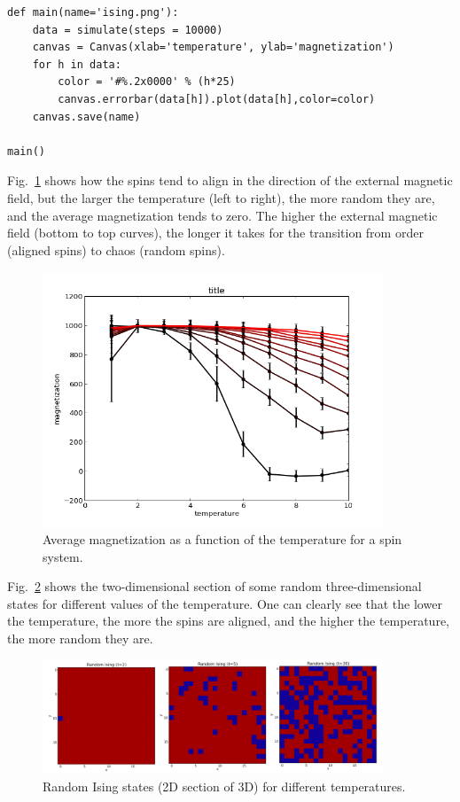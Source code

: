 \documentclass[justified,sixbynine]{tufte-book}
\def\ft{\small\tt}
\theoremstyle{plain}%
\theoremstyle{definition}
\theoremstyle{remark}
\begin{document}
\begin{fullwidth}
\begin{lstlisting}[caption={in file: {\ft ising.py}}]
def main(name='ising.png'):
    data = simulate(steps = 10000)
    canvas = Canvas(xlab='temperature', ylab='magnetization')
    for h in data:
        color = '#%.2x0000' % (h*25)
        canvas.errorbar(data[h]).plot(data[h],color=color)
    canvas.save(name)

main()
\end{lstlisting}


Fig.~\ref{ising-mag} shows how the spins tend to align in the direction of the external magnetic field, but the larger the temperature (left to right), the more random they are, and the average magnetization tends to zero. The higher the external magnetic field (bottom to top curves), the longer it takes for the transition from order (aligned spins) to chaos (random spins).

\begin{figure}[ht]
\centering\includegraphics[width=4in]{images/ising.png}
\caption{Average magnetization as a function of the temperature for a spin system.\label{ising-mag}}
\end{figure}

Fig.~\ref{ising-state} shows the two-dimensional section of some random three-dimensional states for different values of the temperature. One can clearly see that the lower the temperature, the more the spins are aligned, and the higher the temperature, the more random they are.

\begin{figure}[ht]
\centering\includegraphics[width=4in]{images/ising2.png}
\caption{Random Ising states (2D section of 3D) for different temperatures.\label{ising-state}}
\end{figure}


\end{fullwidth}
\end{document}
